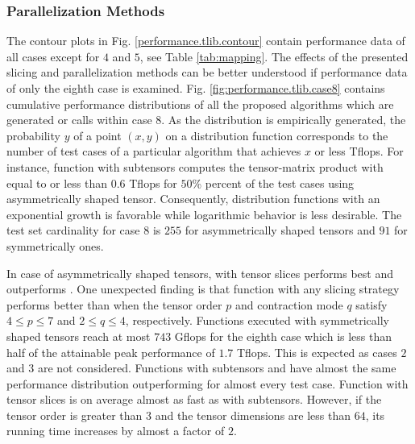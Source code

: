 \subsubsection{Parallelization Methods}
The contour plots in Fig. \ref{performance.tlib.contour} contain performance data of all cases except for $4$ and $5$, see Table \ref{tab:mapping}.
The effects of the presented slicing and parallelization methods can be better understood if performance data of only the eighth case is examined.
Fig. \ref{fig:performance.tlib.case8} contains cumulative performance distributions of all the proposed algorithms which are generated  or  calls within case 8.
As the distribution is empirically generated, the probability $y$ of a point $(x,y)$ on a distribution function corresponds to the number of test cases of a particular algorithm that achieves $x$ or less Tflops.
For instance, function  with subtensors computes the tensor-matrix product with equal to or less than 0.6 Tflops for $50$\% percent of the test cases using asymmetrically shaped tensor.
Consequently, distribution functions with an exponential growth is favorable while logarithmic behavior is less desirable.
The test set cardinality for case 8 is $255$ for asymmetrically shaped tensors and $91$ for symmetrically ones.

In case of asymmetrically shaped tensors,  with tensor slices performs best and outperforms .
One unexpected finding is that function  with any slicing strategy performs better than  when the tensor order $p$ and contraction mode $q$ satisfy $4 \leq p \leq 7$ and $2 \leq q \leq 4$, respectively.
Functions executed with symmetrically shaped tensors reach at most $743$ Gflops for the eighth case which is less than half of the attainable peak performance of $1.7$ Tflops.
This is expected as cases $2$ and $3$ are not considered.
Functions  with subtensors and  have almost the same performance distribution outperforming  for almost every test case.
Function  with tensor slices is on average almost as fast as with subtensors.
However, if the tensor order is greater than $3$ and the tensor dimensions are less than $64$, its running time increases by almost a factor of $2$.

